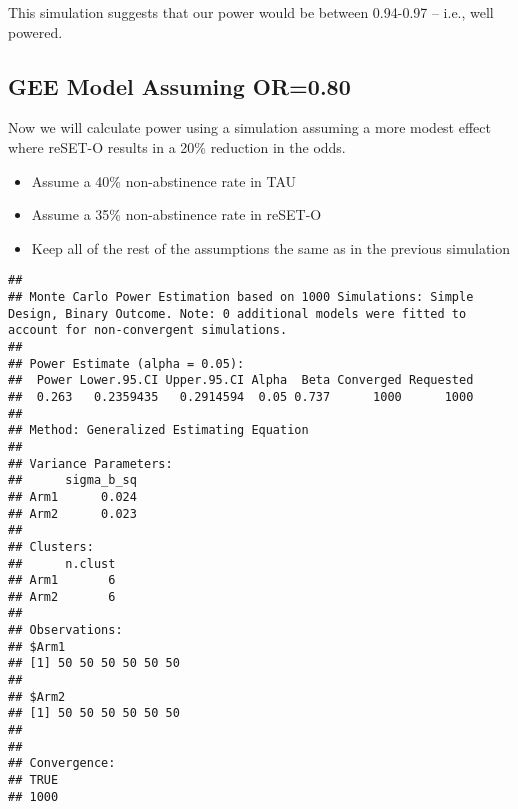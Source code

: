 \documentclass[
]{article}
\newenvironment{Shaded}{\begin{snugshade}}{\end{snugshade}}
\newcommand{\CommentTok}[1]{\textcolor[rgb]{0.56,0.35,0.01}{\textit{#1}}}
\newcommand{\KeywordTok}[1]{\textcolor[rgb]{0.13,0.29,0.53}{\textbf{#1}}}
\newcommand{\NormalTok}[1]{#1}
\newcommand{\StringTok}[1]{\textcolor[rgb]{0.31,0.60,0.02}{#1}}
\providecommand{\tightlist}{%
  \setlength{\itemsep}{0pt}\setlength{\parskip}{0pt}}
\begin{document}
This simulation suggests that our power would be between 0.94-0.97 --
i.e., well powered.

\hypertarget{gee-model-assuming-or0.80}{%
\subsection{GEE Model Assuming
OR=0.80}\label{gee-model-assuming-or0.80}}

Now we will calculate power using a simulation assuming a more modest
effect where reSET-O results in a 20\% reduction in the odds.

\begin{itemize}
\tightlist
\item
  Assume a 40\% non-abstinence rate in TAU
\item
  Assume a 35\% non-abstinence rate in reSET-O
\item
  Keep all of the rest of the assumptions the same as in the previous
  simulation
\end{itemize}

\begin{Shaded}
\end{Shaded}

\begin{verbatim}
## 
## Monte Carlo Power Estimation based on 1000 Simulations: Simple Design, Binary Outcome. Note: 0 additional models were fitted to account for non-convergent simulations.
## 
## Power Estimate (alpha = 0.05):
##  Power Lower.95.CI Upper.95.CI Alpha  Beta Converged Requested
##  0.263   0.2359435   0.2914594  0.05 0.737      1000      1000
## 
## Method: Generalized Estimating Equation 
## 
## Variance Parameters:
##      sigma_b_sq
## Arm1      0.024
## Arm2      0.023
## 
## Clusters:
##      n.clust
## Arm1       6
## Arm2       6
## 
## Observations:
## $Arm1
## [1] 50 50 50 50 50 50
## 
## $Arm2
## [1] 50 50 50 50 50 50
## 
## 
## Convergence:
## TRUE 
## 1000
\end{verbatim}
\end{document}
